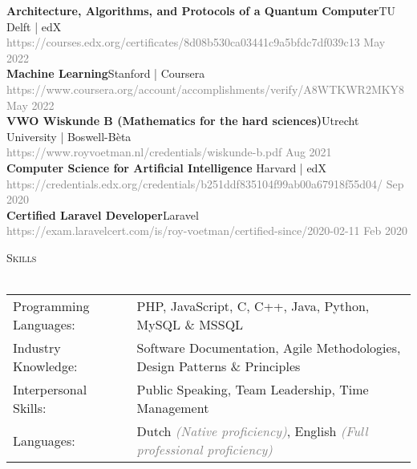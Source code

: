 \documentclass[a4paper]{article}
\newcommand{\lineunder} {
    \vspace*{-8pt} \\
    \hspace*{-18pt} \hrulefill \\
}
\newcommand{\header} [1] {
    {\hspace*{-18pt}\vspace*{6pt} \textsc{#1}}
    \vspace*{-6pt} \lineunder
}
\begin{document}
\textbf{Architecture, Algorithms, and Protocols of a Quantum Computer}\hfill TU Delft | edX\\
 \textcolor{gray}{https://courses.edx.org/certificates/8d08b530ca03441c9a5bfdc7df039c13} \hfill \textcolor{gray}{May 2022}\\
 \vspace{2mm}
 \textbf{Machine Learning}\hfill Stanford | Coursera\\
 \textcolor{gray}{https://www.coursera.org/account/accomplishments/verify/A8WTKWR2MKY8} \hfill \textcolor{gray}{May 2022}\\
 \vspace{2mm}
 \textbf{VWO Wiskunde B (Mathematics for the hard sciences)}\hfill Utrecht University | Boswell-Bèta\\
 \textcolor{gray}{https://www.royvoetman.nl/credentials/wiskunde-b.pdf}
 \hfill \textcolor{gray}{Aug 2021}\\
\vspace{2mm}
\textbf{Computer Science for Artificial Intelligence }\hfill Harvard | edX\\
\textcolor{gray}{https://credentials.edx.org/credentials/b251ddf835104f99ab00a67918f55d04/} \hfill \textcolor{gray}{Sep 2020}\\
\vspace{2mm}
\textbf{Certified Laravel Developer}\hfill Laravel\\
\textcolor{gray}{https://exam.laravelcert.com/is/roy-voetman/certified-since/2020-02-11} \hfill \textcolor{gray}{Feb 2020}\\
\vspace{2mm}

\vspace{5mm}

\header{Skills}
\vspace{2mm}
\begin{tabular}{l l}

	Programming Languages:   & PHP, JavaScript, C, C++, Java, Python, MySQL \& MSSQL
	\vspace{1mm}\\
    
	Industry Knowledge:      & Software Documentation, Agile Methodologies, Design Patterns \& Principles
	\vspace{1mm}\\
	
	Interpersonal Skills:    & Public Speaking, Team Leadership, Time Management
	\vspace{1mm}\\
	
    Languages:               & Dutch \textcolor{gray}{\emph{(Native proficiency)}}, English \textcolor{gray}{\emph{(Full professional proficiency)}}\\
    
\end{tabular}
\vspace{2mm}
\end{document}
